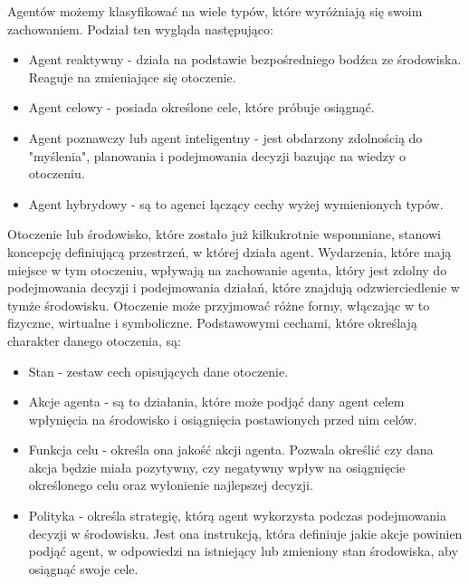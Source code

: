 \par Agentów możemy klasyfikować na wiele typów, które wyróżniają się swoim zachowaniem. Podział ten wygląda następująco:
\begin{itemize}
    \item Agent reaktywny - działa na podstawie bezpośredniego bodźca ze środowiska. Reaguje na zmieniające się otoczenie. %
    \item Agent celowy - posiada określone cele, które próbuje osiągnąć. %
    \item Agent poznawczy lub agent inteligentny - jest obdarzony zdolnością do "myślenia", planowania i podejmowania decyzji bazując na wiedzy o otoczeniu. %
    \item Agent hybrydowy - są to agenci łączący cechy wyżej wymienionych typów.
\end{itemize}

\par Otoczenie lub środowisko, które zostało już kilkukrotnie wspomniane, stanowi koncepcję definiującą przestrzeń, w której działa agent. Wydarzenia, które mają miejsce w tym otoczeniu, wpływają na zachowanie agenta, który jest zdolny do podejmowania decyzji i podejmowania działań, które znajdują odzwierciedlenie w tymże środowisku. Otoczenie może przyjmować różne formy, włączając w to fizyczne, wirtualne i symboliczne. Podstawowymi cechami, które określają charakter danego otoczenia, są:
\begin{itemize}
    \item Stan - zestaw cech opisujących dane otoczenie.
    \item Akcje agenta - są to działania, które może podjąć dany agent celem wpłynięcia na środowisko i osiągnięcia postawionych przed nim celów.
    \item Funkcja celu - określa ona jakość akcji agenta. Pozwala określić czy dana akcja będzie miała pozytywny, czy negatywny wpływ na osiągnięcie określonego celu oraz wyłonienie najlepszej decyzji.
    \item Polityka - określa strategię, którą agent wykorzysta podczas podejmowania decyzji w środowisku. Jest ona instrukcją, która definiuje jakie akcje powinien podjąć agent, w odpowiedzi na istniejący lub zmieniony stan środowiska, aby osiągnąć swoje cele.
\end{itemize}